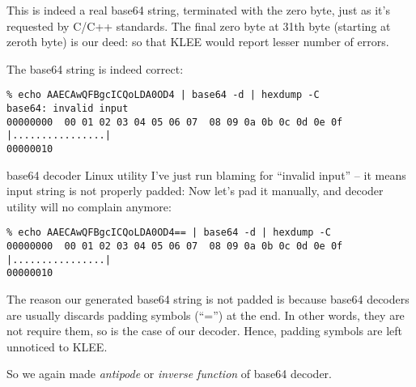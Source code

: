 This is indeed a real base64 string, terminated with the zero byte, just as it's requested by C/C++ standards.
The final zero byte at 31th byte (starting at zeroth byte) is our deed: so that KLEE would report lesser number of errors. %

The base64 string is indeed correct:

\begin{lstlisting}
% echo AAECAwQFBgcICQoLDA0OD4 | base64 -d | hexdump -C
base64: invalid input
00000000  00 01 02 03 04 05 06 07  08 09 0a 0b 0c 0d 0e 0f  |................|
00000010
\end{lstlisting}

base64 decoder Linux utility I've just run blaming for ``invalid input'' -- it means input string is not properly padded:
Now let's pad it manually, and decoder utility will no complain anymore:

\begin{lstlisting}
% echo AAECAwQFBgcICQoLDA0OD4== | base64 -d | hexdump -C
00000000  00 01 02 03 04 05 06 07  08 09 0a 0b 0c 0d 0e 0f  |................|
00000010
\end{lstlisting}

The reason our generated base64 string is not padded is because base64 decoders are usually discards padding symbols (``='') at the end.
In other words, they are not require them, so is the case of our decoder.
Hence, padding symbols are left unnoticed to KLEE.

So we again made \textit{antipode} or \textit{inverse function} of base64 decoder.

